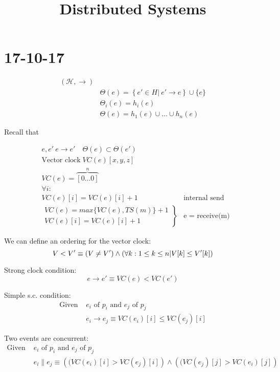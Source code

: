 \documentclass[]{article}
\title{Distributed Systems}
\author{}
\begin{document}
\maketitle

\section{17-10-17}

\begin{align*}
	(\mathscr{H}, \rightarrow)\\
	&\Theta(e) =\left\{e'\in H |\ e'\rightarrow e  \right\} \cup \{e\}\\
	&\Theta_i(e) = h_i(e)\\
	&\Theta(e) = h_1(e) \cup \dots \cup h_n(e)
\end{align*}

Recall that

\begin{align*}
&e, e' \ e\rightarrow e'\quad \Theta(e) \subset \Theta(e')\\
&\text{Vector clock}\; VC(e)[x, y, z]\\
&VC(e) = \overbrace{[0 \dots 0]}^{n}\\
&\forall i:&\\
&VC(e)[i] = VC(e)[i] + 1\; &\text{internal send}\\
&\left.\begin{array}{l}
VC(e) = max\{VC(e), TS(m)\} + 1\\
VC(e)[i] = VC(e)[i] + 1
\end{array}
\right\rbrace & \text{e = receive(m)}
\end{align*}

We can define an ordering for the vector clock:
\[
V < V' \equiv (V \neq V') \wedge (\forall k: 1 \leq k \leq n | V[k] \leq V'[k])\\
\]

Strong clock condition:
\[
e \rightarrow e' \equiv VC(e) < VC(e')
\]

Simple s.c. condition:
\begin{align*}
\text{Given }&e_i \text{ of }p_i \text{ and } e_j \text{ of }p_j\\
&e_i \rightarrow e_j \equiv VC(e_i)[i] \leq VC(e_j)[i]
\end{align*}

Two events are concurrent:
\begin{align*}
\text{Given }&e_i \text{ of }p_i \text{ and } e_j \text{ of }p_j\\
&e_i \parallel e_j \equiv \left((VC(e_i)[i] > VC(e_j)[i]\right) \wedge \left((VC(e_j)[j] > VC(e_i)[j]\right)
\end{align*}
\end{document}
